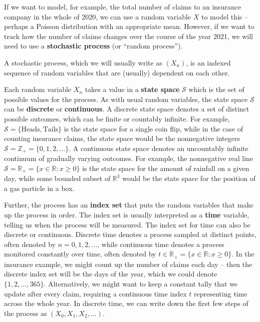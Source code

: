 \documentclass[
  a4paper,
]{article}
\theoremstyle{definition}
\theoremstyle{definition}
\theoremstyle{definition}
\theoremstyle{remark}
\begin{document}
If we want to model, for example, the total number of claims to an insurance company in the whole of 2020, we can use a random variable \(X\) to model this -- perhaps a Poisson distribution with an appropriate mean. However, if we want to track how the number of claims changes over the course of the year 2021, we will need to use a \textbf{stochastic process} (or ``random process'').

A stochastic process, which we will usually write as \((X_n)\), is an indexed sequence of random variables that are (usually) dependent on each other.

Each random variable \(X_n\) takes a value in a \textbf{state space} \(\mathcal S\) which is the set of possible values for the process. As with usual random variables, the state space \(\mathcal S\) can be \textbf{discrete} or \textbf{continuous}. A discrete state space denotes a set of distinct possible outcomes, which can be finite or countably infinite. For example, \(\mathcal S = \{\text{Heads},\text{Tails}\}\) is the state space for a single coin flip, while in the case of counting insurance claims, the state space would be the nonnegative integers \(\mathcal S = \mathbb Z_+ = \{0,1,2,\dots\}\). A continuous state space denotes an uncountably infinite continuum of gradually varying outcomes. For example, the nonnegative real line \(\mathcal S = \mathbb R_+ = \{x \in \mathbb R : x \geq 0\}\) is the state space for the amount of rainfall on a given day, while some bounded subset of \(\mathbb R^3\) would be the state space for the position of a gas particle in a box.

Further, the process has an \textbf{index set} that puts the random variables that make up the process in order. The index set is usually interpreted as a \textbf{time} variable, telling us when the process will be measured. The index set for time can also be discrete or continuous. Discrete time denotes a process sampled at distinct points, often denoted by \(n = 0,1,2,\dots\), while continuous time denotes a process monitored constantly over time, often denoted by \(t \in \mathbb R_+ = \{x \in \mathbb R : x \geq 0\}\). In the insurance example, we might count up the number of claims each day -- then the discrete index set will be the days of the year, which we could denote \(\{1,2,\dots,365\}\). Alternatively, we might want to keep a constant tally that we update after every claim, requiring a continuous time index \(t\) representing time across the whole year. In discrete time, we can write down the first few steps of the process as \((X_0, X_1, X_2, \dots)\).
\end{document}
